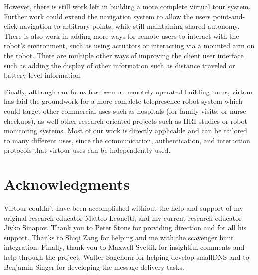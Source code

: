 \documentclass[
  oneside,
  11pt, a4paper,
  footinclude=true,
  headinclude=true,
  cleardoublepage=empty
]{article}
\begin{document}
However, there is still work left in building a more complete virtual tour
system. Further work could extend the navigation system to allow the users
point-and-click navigation to arbitrary points, while still maintaining shared
autonomy. There is also work in adding more ways for remote users to interact
with the robot's environment, such as using actuators or interacting via a
mounted arm on the robot. There are multiple other ways of improving the client
user interface such as adding the display of other information such as distance
traveled or battery level information.

Finally, although our focus has been on remotely operated building tours,
virtour has laid the groundwork for a more complete telepresence robot system
which could target other commercial uses such as hospitals (for family visits,
or nurse checkups), as well other research-oriented projects such as HRI
studies or robot monitoring systems. Most of our work is directly applicable
and can be tailored to many different uses, since the communication,
authentication, and interaction protocols that virtour uses can be independently
used.

\section{Acknowledgments}

Virtour couldn't have been accomplished withiout the help and support of my
original research educator Matteo Leonetti, and my current research educator
Jivko Sinapov. Thank you to Peter Stone for providing direction and for all his
support. Thanks to Shiqi Zang for helping and me with the scavenger hunt
integration. Finally, thank you to Maxwell Svetlik for insightful comments and
help through the project, Walter Sagehorn for helping develop smallDNS and to
Benjamin Singer for developing the message delivery tasks.

\nocite{*}


    
\end{document}
